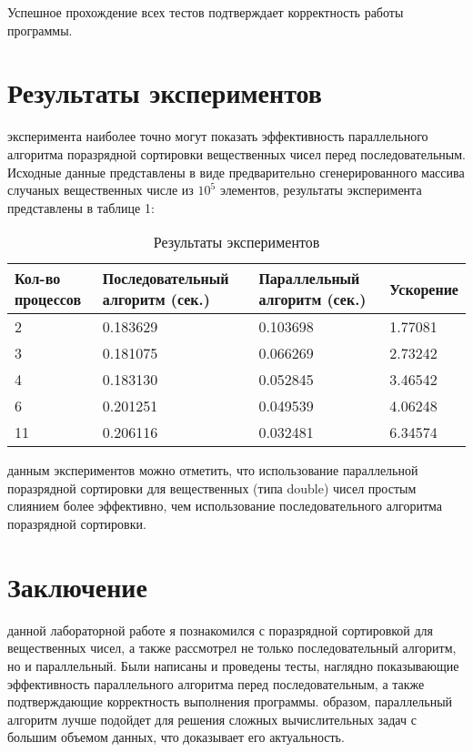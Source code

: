 \documentclass[12pt]{report}
\begin{document}
\par Успешное прохождение всех тестов подтверждает корректность работы программы.
\newpage


\section*{Результаты экспериментов}
 эксперимента наиболее точно могут показать эффективность параллельного алгоритма поразрядной сортировки вещественных чисел перед последовательным. Исходные данные представлены в виде предварительно сгенерированного массива случаных вещественных числе из $10^{5}$ элементов, результаты эксперимента представлены в таблице 1:

\begin{table}[!h]
    \centering
    \begin{tabular}{ | l | l | l | l |}
    \hline
    \scriptsize{Кол-во процессов} & \scriptsize{Последовательный алгоритм (сек.)} & \scriptsize{Параллельный алгоритм (сек.)} & \scriptsize{Ускорение}  \\ \hline
    2   &   0.183629    &   0.103698    &   1.77081 \\ \hline
    3   &   0.181075    &   0.066269    &   2.73242  \\ \hline
    4   &   0.183130    &   0.052845    &   3.46542  \\ \hline
    6   &   0.201251    &   0.049539    &   4.06248  \\ \hline
    11   &   0.206116    &   0.032481    &   6.34574  \\ \hline
    \end{tabular}
    \caption{Результаты экспериментов}
    \end{table}

 данным экспериментов можно отметить, что использование параллельной поразрядной
сортировки для вещественных (типа double) чисел простым слиянием более эффективно, чем использование последовательного алгоритма поразрядной сортировки.

\newpage


\section*{Заключение}
 данной лабораторной работе я познакомился с поразрядной сортировкой для вещественных чисел, а также рассмотрел не только последовательный алгоритм, но и параллельный. Были написаны и проведены тесты, наглядно показывающие эффективность параллельного алгоритма перед последовательным, а также подтверждающие корректность выполнения программы.
 образом, параллельный алгоритм лучше подойдет для решения сложных вычислительных задач с большим объемом данных, что доказывает его актуальность.
\newpage
\end{document}
